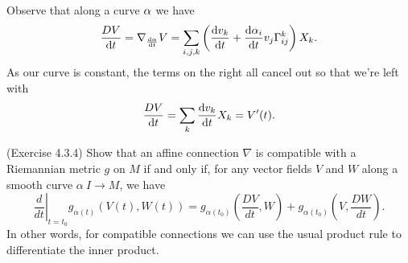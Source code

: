 \documentclass[12pt]{memoir}
\begin{document}
\begin{ptcbr}
	Observe that along a curve $\alpha$ we have 
	$$\frac{DV}{\dd t}=\nabla_{\dv{\alpha}{t}}V=\sum_{i,j,k}\left(\dv{v_k}{t}+\dv{\alpha_i}{t}v_j\Gamma_{ij}^k\right)X_k.$$
	As our curve is constant, the terms on the right all cancel out so that we're left with 
	$$\frac{DV}{\dd t}=\sum_k\dv{v_k}{t}X_k=V'(t).$$
\end{ptcbr}

\begin{Ej}
	(Exercise 4.3.4) Show that an affine connection $\nabla$ is compatible with a Riemannian metric $g$ on $M$ if and only if, for any vector fields $V$ and $W$ along a smooth curve $\alpha \: I \to M$, we have
	\[
		\left.\frac{d}{dt}\right|_{t=t_0} g_{\alpha(t)}(V(t),W(t)) = g_{\alpha(t_0)} \left(\frac{DV}{dt},W\right) + g_{\alpha(t_0)} \left(V,\frac{DW}{dt}\right).
	\]
	In other words, for compatible connections we can use the usual product rule to differentiate the inner product.
\end{Ej}
\end{document}
